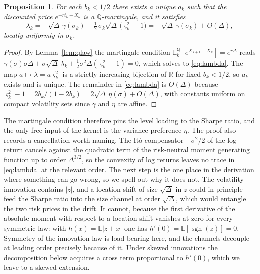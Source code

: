 \documentclass[11pt]{article}
\newtheorem{proposition}[theorem]{Proposition}
\theoremstyle{remark}
\newcommand{\E}{\mathbb{E}}
\newcommand{\Qm}{\mathbb{Q}}
\newcommand{\R}{\mathbb{R}}
\newcommand{\Dt}{\Delta}
\begin{document}
\begin{proposition}\label{prop:pinned}
For each $b_k<1/2$ there exists a unique $a_k$ such that the discounted
price $e^{-r t_k+X_k}$ is a $\Qm$-martingale, and it satisfies
\begin{equation}\label{eq:lambda}
\lambda_k=-\sqrt{\Dt}\,\gamma(\sigma_k)
-\tfrac{1}{2}\,\sigma_k\sqrt{\Dt}\,\big(\varsigma_k^{2}-1\big)
=-\sqrt{\Dt}\,\gamma(\sigma_k)+O(\Dt),
\end{equation}
locally uniformly in $\sigma_k$.
\end{proposition}

\begin{proof}
By Lemma~\ref{lem:qlaw} the martingale condition
$\E^{\Qm}_k[e^{X_{k+1}-X_k}]=e^{r\Dt}$ reads
$\gamma(\sigma)\sigma\Dt+\sigma\sqrt{\Dt}\,\lambda_k
+\tfrac{1}{2}\sigma^2\Dt(\varsigma_k^2-1)=0$, which solves to
\eqref{eq:lambda}.
The map $a\mapsto\lambda=a\varsigma_k^2$ is a strictly increasing bijection
of $\R$ for fixed $b_k<1/2$, so $a_k$ exists and is unique.
The remainder in \eqref{eq:lambda} is $O(\Dt)$ because
$\varsigma_k^2-1=2b_k/(1-2b_k)=2\sqrt{\Dt}\,\eta(\sigma)+O(\Dt)$, with
constants uniform on compact volatility sets since $\gamma$ and $\eta$ are
affine.
\end{proof}

The martingale condition therefore pins the level loading to the Sharpe
ratio, and the only free input of the kernel is the variance preference
$\eta$.
The proof also records a cancellation worth naming.
The It\^{o} compensator $-\sigma^2/2$ of the log return cancels against the
quadratic term of the risk-neutral moment generating function up to order
$\Dt^{3/2}$, so the convexity of log returns leaves no trace in
\eqref{eq:lambda} at the relevant order.
The next step is the one place in the derivation where something can go
wrong, so we spell out why it does not.
The volatility innovation contains $|z|$, and a location shift of size
$\sqrt{\Dt}$ in $z$ could in principle feed the Sharpe ratio into the size
channel at order $\sqrt{\Dt}$, which would entangle the two risk prices in
the drift.
It cannot, because the first derivative of the absolute moment with respect
to a location shift vanishes at zero for every symmetric law: with
$h(x)=\E|z+x|$ one has $h'(0)=\E[\operatorname{sgn}(z)]=0$.
Symmetry of the innovation law is load-bearing here, and the channels
decouple at leading order precisely because of it.
Under skewed innovations the decomposition below acquires a cross term
proportional to $h'(0)$, which we leave to a skewed extension.
\end{document}
